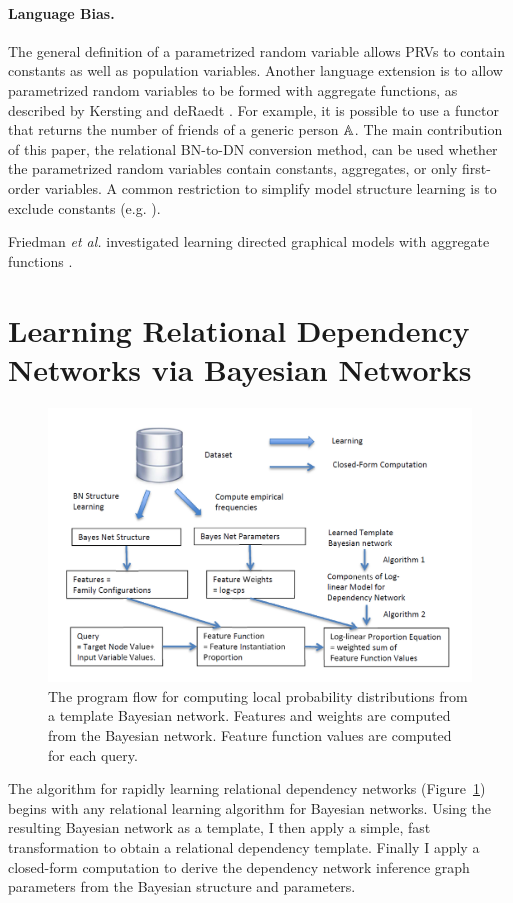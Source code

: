 \documentclass{sfuthesis}
\begin{document}
\paragraph{Language Bias.}
The general definition of a parametrized random variable allows PRVs to contain constants as well as population variables. Another language extension is to allow parametrized random variables to be formed with aggregate functions, as described by Kersting and deRaedt \cite{Kersting2007}. For example, it is possible to use a functor that returns the number of friends of a generic person $\mathbb{A}$. The main contribution of this paper, the relational BN-to-DN conversion method, can be used whether the parametrized random variables contain constants, aggregates, or only first-order variables. A common restriction to simplify model structure learning is to exclude constants (e.g. \cite{Friedman99prm,Domingos2009}). 

Friedman {\em et al.} investigated learning directed graphical models with aggregate functions \cite{Friedman99prm}. 





\section{Learning Relational Dependency Networks via Bayesian Networks}\label{sect:learning}
\begin{figure}[!h]
\begin{center}
\includegraphics[width=1\textwidth]{bn-regress.png}
\caption{The program flow for computing local probability distributions from a template Bayesian network. Features and weights are computed from the Bayesian network. Feature function values are computed for each query. \label{fig:bn-flow}}
\end{center}
\end{figure}
The algorithm for rapidly learning relational dependency networks (Figure~\ref{fig:bn-flow}) begins with any relational learning algorithm for Bayesian networks. Using the resulting Bayesian network as a template, I  then apply a simple, fast transformation to obtain a relational dependency template. Finally I  apply a closed-form computation to derive the dependency network inference graph parameters from the Bayesian structure and parameters. 
\end{document}
